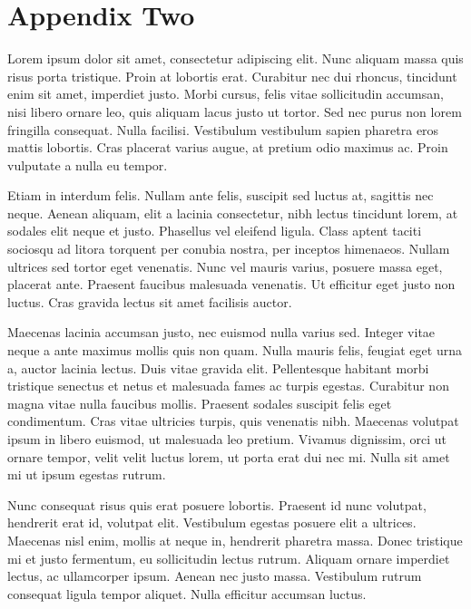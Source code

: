 
\newpage
\chapter{Appendix Two}


Lorem ipsum dolor sit amet, consectetur adipiscing elit. Nunc aliquam massa quis risus porta tristique. Proin at lobortis erat. Curabitur nec dui rhoncus, tincidunt enim sit amet, imperdiet justo. Morbi cursus, felis vitae sollicitudin accumsan, nisi libero ornare leo, quis aliquam lacus justo ut tortor. Sed nec purus non lorem fringilla consequat. Nulla facilisi. Vestibulum vestibulum sapien pharetra eros mattis lobortis. Cras placerat varius augue, at pretium odio maximus ac. Proin vulputate a nulla eu tempor.

Etiam in interdum felis. Nullam ante felis, suscipit sed luctus at, sagittis nec neque. Aenean aliquam, elit a lacinia consectetur, nibh lectus tincidunt lorem, at sodales elit neque et justo. Phasellus vel eleifend ligula. Class aptent taciti sociosqu ad litora torquent per conubia nostra, per inceptos himenaeos. Nullam ultrices sed tortor eget venenatis. Nunc vel mauris varius, posuere massa eget, placerat ante. Praesent faucibus malesuada venenatis. Ut efficitur eget justo non luctus. Cras gravida lectus sit amet facilisis auctor.

Maecenas lacinia accumsan justo, nec euismod nulla varius sed. Integer vitae neque a ante maximus mollis quis non quam. Nulla mauris felis, feugiat eget urna a, auctor lacinia lectus. Duis vitae gravida elit. Pellentesque habitant morbi tristique senectus et netus et malesuada fames ac turpis egestas. Curabitur non magna vitae nulla faucibus mollis. Praesent sodales suscipit felis eget condimentum. Cras vitae ultricies turpis, quis venenatis nibh. Maecenas volutpat ipsum in libero euismod, ut malesuada leo pretium. Vivamus dignissim, orci ut ornare tempor, velit velit luctus lorem, ut porta erat dui nec mi. Nulla sit amet mi ut ipsum egestas rutrum.

Nunc consequat risus quis erat posuere lobortis. Praesent id nunc volutpat, hendrerit erat id, volutpat elit. Vestibulum egestas posuere elit a ultrices. Maecenas nisl enim, mollis at neque in, hendrerit pharetra massa. Donec tristique mi et justo fermentum, eu sollicitudin lectus rutrum. Aliquam ornare imperdiet lectus, ac ullamcorper ipsum. Aenean nec justo massa. Vestibulum rutrum consequat ligula tempor aliquet. Nulla efficitur accumsan luctus.

